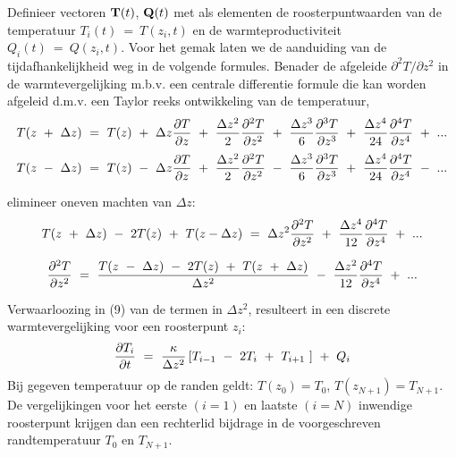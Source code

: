 
Definieer vectoren ${\bf T} (t)$, ${\bf Q} (t)$ 
met als elementen de roosterpuntwaarden
van de temperatuur 
$T_i (t) \ =\  T(z_i ,t)$
en de warmteproductiviteit
$Q_i (t) \ =\  Q(z_i ,t)$.
Voor het gemak 
laten we de aanduiding van de tijdafhankelijkheid weg in de volgende
formules.
Benader de afgeleide $\partial^2 T / \partial z^2$ 
in de warmtevergelijking m.b.v. een centrale differentie formule die
kan worden afgeleid d.m.v. een Taylor reeks ontwikkeling van de 
temperatuur,
\begin{equation}
T(z\ +\  \Delta z) \ =\  T(z) \ +\  
\Delta z {\partial T  \over \partial z} \ +\ 
{\Delta z^2  \over 2 }{\partial^2 T  \over \partial z^2} \ +\ 
{\Delta z^3  \over 6 }{\partial^3 T  \over \partial z^3} \ +\ 
{\Delta z^4  \over 24 }{\partial^4 T  \over \partial z^4} \ +\ 
 ...
\end{equation}
\vspace{0.5cm}
\begin{equation}
T(z\ -\  \Delta z) \ =\  T(z) \ -\  
\Delta z {\partial T  \over \partial z} \ +\ 
{\Delta z^2  \over 2 }{\partial^2 T  \over \partial z^2} \ -\ 
{\Delta z^3  \over 6 }{\partial^3 T  \over \partial z^3} \ +\ 
{\Delta z^4  \over 24 }{\partial^4 T  \over \partial z^4} \ -\ 
 ...
\end{equation}

\vspace{0.5cm}
\noindent
elimineer oneven machten van $\Delta z$:
\begin{equation}
T(z\ +\  \Delta z) \ -\  2T(z) \ +\  T(z- \Delta z ) \ =\ 
{\Delta z^2}         {\partial^2 T  \over \partial z^2} \ +\ 
{\Delta z^4  \over 12 }{\partial^4 T  \over \partial z^4} \ +\ 
 ...
\end{equation}

\vspace{0.5cm}
\noindent
\begin{equation}
{\partial^2 T  \over \partial z^2}
\ =\ 
{T(z\ -\  \Delta z) \ -\  2 T(z) \ +\  T(z\ +\  \Delta z)  \over \Delta z^2} 
\ -\ 
{\Delta z^2  \over 12 }{\partial^4 T  \over \partial z^4}
\ +\ 
 ...
\end{equation}

\vspace{0.5cm}
\noindent
Verwaarloozing in (9) van de termen in $\Delta z^2$, resulteert in een
discrete warmtevergelijking voor een roosterpunt $z_i$:
\begin{equation}
{\partial T_i  \over \partial t} \ =\ 
{\kappa \over \Delta z^2}
\left[
       T_{i-1} \ -\  2 T_i \ +\  T_{i+1}  \ 
\right]
\ +\ 
Q_i
\end{equation}
Bij gegeven temperatuur op de randen geldt:
$T (z_0 ) = T_0$,
$T (z_{N+1} ) = T_{N+1}$. 
De vergelijkingen voor het eerste $(i = 1)$ en laatste $(i = N)$
inwendige roosterpunt krijgen dan een rechterlid bijdrage in de 
voorgeschreven randtemperatuur $T_0$ en $T_{N+1}$.

